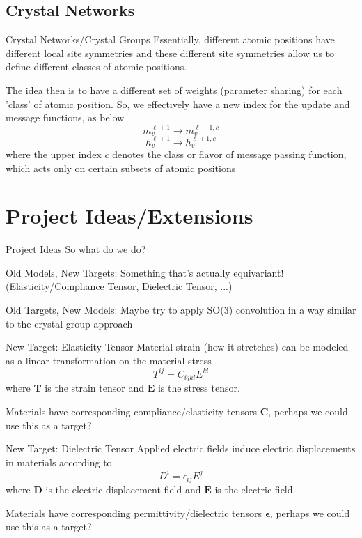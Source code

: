 \documentclass[handout, 11pt]{beamer}
\begin{document}
\subsection{Crystal Networks}
\begin{frame}{Crystal Networks/Crystal Groups}
Essentially, different atomic positions have different local site symmetries and these different site symmetries allow us to define different classes of atomic positions.

\medskip

The idea then is to have a different set of weights (parameter sharing) for each 'class' of atomic position. So, we effectively have a new index for the update and message functions, as below
$$
m_v^{\ell +1} \rightarrow m_v^{\ell +1, c}
$$
$$
h_v^{\ell+1}\rightarrow h_v^{\ell +1, c}
$$
where the upper index $c$ denotes the class or flavor of message passing function, which acts only on certain subsets of atomic positions
\end{frame}

\section{Project Ideas/Extensions}
\begin{frame}{Project Ideas}
So what do we do?

\vspace{1cm}

Old Models, New Targets: Something that's actually equivariant! (Elasticity/Compliance Tensor, Dielectric Tensor, ...)

\vspace{2cm}

Old Targets, New Models: Maybe try to apply SO(3) convolution in a way similar to the crystal group approach
\end{frame}

\begin{frame}{New Target: Elasticity Tensor}
Material strain (how it stretches) can be modeled as a linear transformation on the material stress
$$
T^{ij}=C_{ijkl}E^{kl}
$$
where $\mathbf{T}$ is the strain tensor and $\mathbf{E}$ is the stress tensor.

\medskip

Materials have corresponding compliance/elasticity tensors $\mathbf{C}$, perhaps we could use this as a target?
\end{frame}

\begin{frame}{New Target: Dielectric Tensor}
Applied electric fields induce electric displacements in materials according to 
$$
D^i = \epsilon_{ij}E^j
$$
where $\mathbf{D}$ is the electric displacement field and $\mathbf{E}$ is the electric field. 

\medskip

Materials have corresponding permittivity/dielectric tensors $\mathbf{\epsilon}$, perhaps we could use this as a target?

\end{frame}
\end{document}
